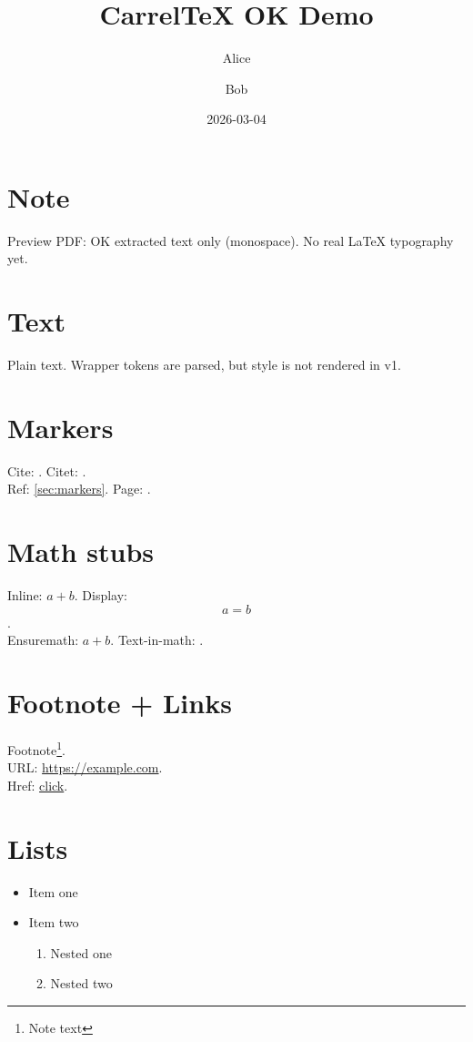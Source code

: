 \documentclass{article}
\begin{document}
\section*{Note}
Preview PDF: OK extracted text only (monospace). No real LaTeX typography yet.

\title{CarrelTeX OK Demo}
\author{Alice \and Bob}
\date{2026-03-04}
\maketitle

\section*{Text}
Plain text. Wrapper tokens are parsed, but style is not rendered in v1.

\section[Short]{Markers}
Cite: \cite{demo-key}. Citet: \citet{demo-key}.\\
Ref: \ref{sec:markers}. Page: \pageref{sec:markers}.
\label{sec:markers}

\section*{Math stubs}
Inline: $a+b$. Display: $$a=b$$.\\
Ensuremath: \ensuremath{a+b}. Text-in-math: .

\section*{Footnote + Links}
Footnote\footnote[3]{Note text}.\\
URL: \url{https://example.com}.\\
Href: \href{https://example.com}{click}.

\section*{Lists}
\begin{itemize}
\item Item one
\item Item two
\begin{enumerate}
\item Nested one
\item Nested two
\end{enumerate}
\end{itemize}
\end{document}
